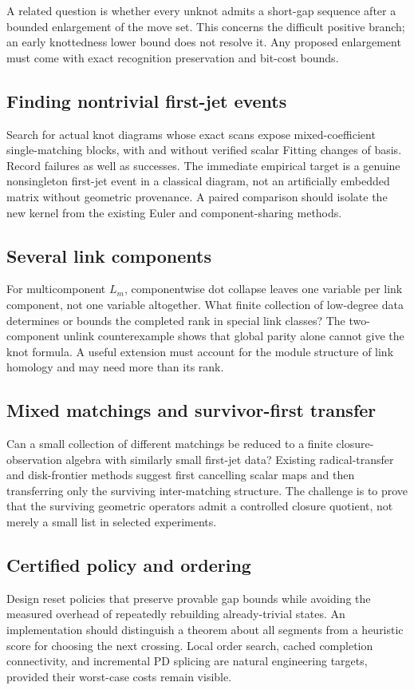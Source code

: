 \documentclass[11pt]{article}
\theoremstyle{definition}\newtheorem{definition}[theorem]{Definition}\newtheorem{example}[theorem]{Example}
\theoremstyle{remark}\newtheorem{remark}[theorem]{Remark}
\begin{document}
A related question is whether every unknot admits a short-gap sequence after a bounded enlargement of the move set. This concerns the difficult positive branch; an early knottedness lower bound does not resolve it. Any proposed enlargement must come with exact recognition preservation and bit-cost bounds.

\subsection{Finding nontrivial first-jet events}
Search for actual knot diagrams whose exact scans expose mixed-coefficient single-matching blocks, with and without verified scalar Fitting changes of basis. Record failures as well as successes. The immediate empirical target is a genuine nonsingleton first-jet event in a classical diagram, not an artificially embedded matrix without geometric provenance. A paired comparison should isolate the new kernel from the existing Euler and component-sharing methods.

\subsection{Several link components}
For multicomponent $L_m$, componentwise dot collapse leaves one variable per link component, not one variable altogether. What finite collection of low-degree data determines or bounds the completed rank in special link classes? The two-component unlink counterexample shows that global parity alone cannot give the knot formula. A useful extension must account for the module structure of link homology and may need more than its rank.

\subsection{Mixed matchings and survivor-first transfer}
Can a small collection of different matchings be reduced to a finite closure-observation algebra with similarly small first-jet data? Existing radical-transfer and disk-frontier methods suggest first cancelling scalar maps and then transferring only the surviving inter-matching structure. The challenge is to prove that the surviving geometric operators admit a controlled closure quotient, not merely a small list in selected experiments.

\subsection{Certified policy and ordering}
Design reset policies that preserve provable gap bounds while avoiding the measured overhead of repeatedly rebuilding already-trivial states. An implementation should distinguish a theorem about all segments from a heuristic score for choosing the next crossing. Local order search, cached completion connectivity, and incremental PD splicing are natural engineering targets, provided their worst-case costs remain visible.
\end{document}
